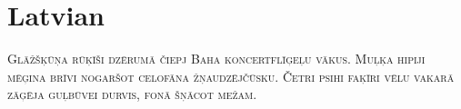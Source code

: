 

\presection\section*{\checkno Latvian}\postsection

\textsc{Glāžšķūņa rūķīši dzērumā čiepj Baha koncertflīģeļu vākus.
Muļķa hipiji mēģina brīvi nogaršot celofāna žņaudzējčūsku.
Četri psihi faķīri vēlu vakarā zāģēja guļbūvei durvis, fonā šņācot mežam.}